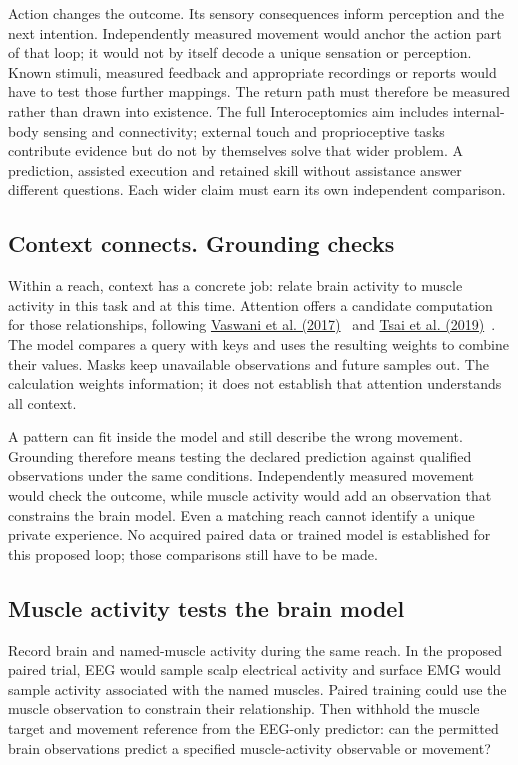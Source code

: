 Action changes the outcome. Its sensory consequences inform perception and
the next intention. Independently measured movement would anchor the action
part of that loop; it would not by itself decode a unique sensation or
perception. Known stimuli, measured feedback and appropriate recordings or
reports would have to test those further mappings. The return path must
therefore be measured rather than drawn into existence. The full
Interoceptomics aim includes internal-body sensing and connectivity; external
touch and proprioceptive tasks contribute evidence but do not by themselves
solve that wider problem. A prediction, assisted execution and retained skill
without assistance answer different questions. Each wider claim must earn
its own independent comparison.

\subsection{Context connects. Grounding checks}
Within a reach, context has a concrete job: relate brain activity to muscle
activity in this task and at this time. Attention offers a candidate computation for those relationships, following
\href{https://arxiv.org/html/1706.03762v7}{Vaswani et al. (2017)}~\cite{vaswani2017} and \href{https://aclanthology.org/P19-1656/}{Tsai et al. (2019)}~\cite{tsai2019}. The model compares a query with keys and uses the resulting weights to combine their values. Masks keep unavailable observations and future
samples out. The calculation weights information; it does not establish that
attention understands all context.

A pattern can fit inside the model and still describe the wrong movement.
Grounding therefore means testing the declared prediction against qualified
observations under the same conditions. Independently measured movement would
check the outcome, while muscle activity would add an observation that
constrains the brain model. Even a matching reach cannot identify a unique
private experience. No acquired paired data or trained model is established
for this proposed loop; those comparisons still have to be made.

\subsection{Muscle activity tests the brain model}
Record brain and named-muscle activity during the same reach. In the proposed
paired trial, EEG would sample scalp electrical activity and surface EMG would
sample activity associated with the named muscles. Paired training could use
the muscle observation to constrain their relationship. Then withhold the
muscle target and movement reference from the EEG-only predictor: can the
permitted brain observations predict a specified muscle-activity observable
or movement?

